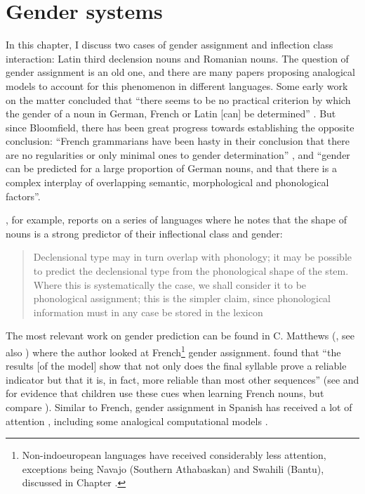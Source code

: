 \chapter{Gender systems}\label{chap:gender-assignment}

In this chapter, I discuss two cases of gender assignment and inflection class interaction: Latin third declension nouns and Romanian nouns. The question of gender assignment is an old one, and there are many papers proposing analogical models to account for this phenomenon in different languages. Some early work on the matter concluded that ``there seems to be no practical criterion by which the gender of a noun in German, French or Latin [can] be determined'' \autocite[p. 280]{Bloomfield.1933a}. But since Bloomfield, there has been great progress towards establishing the opposite conclusion: ``French  grammarians  have  been  hasty  in  their  conclusion  that there are no regularities or only minimal ones to gender determination'' \autocite[316]{Tucker.1968}, and ``gender can be predicted for a large proportion of German nouns, and that there is a complex interplay of overlapping semantic, morphological and phonological factors''\autocite[49]{Corbett.1991}.

\textcite{Corbett.1991}, for example, reports on a series of languages where he notes that the shape of nouns is a strong predictor of their inflectional class and gender:

\begin{quotation}
Declensional type may in turn overlap with phonology; it may be possible to predict the declensional type from the phonological shape of the stem. Where this is systematically the case, we shall consider it to be phonological assignment; this is the simpler claim, since phonological information must in any case be stored in the lexicon \autocite[34]{Corbett.1991}
\end{quotation}

The most relevant work on gender prediction can be found in C. Matthews (, see also \citealt{Lyster.2006}) where the author looked at French\footnote{Non-indoeuropean languages have received considerably less attention, exceptions being Navajo (Southern Athabaskan) \autocites{Eddington.2006, McDonough.2013} and Swahili (Bantu), discussed in Chapter .} gender assignment. \textcite[879]{Matthews.2010} found that ``the results [of the model] show that not only does the final syllable prove a reliable indicator but that it is, in fact, more reliable than most other sequences'' (see \textcite{Marchal.2007} and \textcite{Seigneuric.2007} for evidence that children use these cues when learning French nouns, but compare \textcite{Boloh.2010}). Similar to French, gender assignment in Spanish has received a lot of attention \autocite{Morin.2006, Sanchez.1995, Smead.2000}, including some analogical computational models \autocite{Eddington.2002}.

